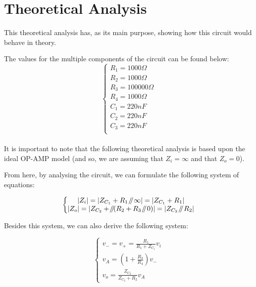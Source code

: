 \section{Theoretical Analysis}
\label{analysis}

\paragraph{}
This theoretical analysis has, as its main purpose, showing how this circuit would behave in theory.

The values for the multiple components of the circuit can be found below:
\[ 
\left\{\begin{matrix}
	R_{1}= 1000 \Omega\\	
	R_{2}= 1000 \Omega\\
	R_{3}= 100000 \Omega\\
	R_{4}= 1000 \Omega\\
	C_{1}= 220 nF\\
	C_{2}= 220 nF\\
	C_{3}= 220 nF\\
	
\end{matrix}\right.
\]


\paragraph{}It is important to note that the following theoretical analysis is based upon the ideal OP-AMP model (and so, we are assuming that $Z_i = \infty$ and that $Z_o = 0$).

From here, by analysing the circuit, we can formulate the following system of equations:

\[ 
\left\{\begin{matrix}
	|Z_i| = |Z_{C_1} + R_1 \parallelsum \infty| = |Z_{C_1} + R_1|\\
	|Z_o| = |Z_{C_2} + \parallelsum (R_2 + R_3 \parallelsum 0)| = |Z_{C_2} \parallelsum R_2|\\
\end{matrix}\right.
\]

Besides this system, we can also derive the following system:

\[ 
\left\{\begin{matrix}
	v_- = v_+ = \frac{R_1}{R_1 + Z_{C_1}} v_i\\
	v_A = (1 + \frac{R_3}{R_4}) v_-\\
	v_o = \frac{Z_{C_2}}{Z_{C_2} + R_2} v_A
\end{matrix}\right.
\]

